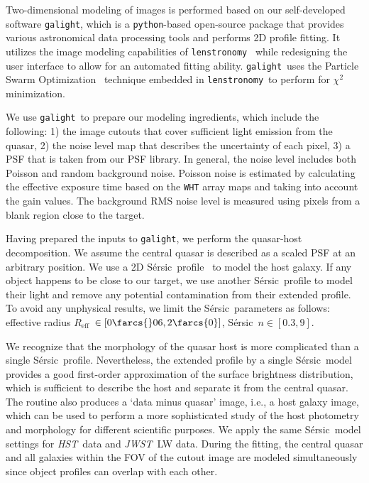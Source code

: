 \documentclass[twocolumn]{aastex631}
\newcommand{\sersic}{S\'ersic}
\newcommand{\lenstronomy}{\texttt{lenstronomy}}
\newcommand{\galight}{\texttt{galight}}
\newcommand{\reff}{{$R_{\mathrm{eff}}$}}
\newcommand{\hst}{{\it HST}}
\newcommand{\jwst}{{\it JWST}}
\begin{document}
Two-dimensional modeling of images is performed based on our self-developed software \galight, which is a \texttt{python}-based open-source package that provides various astronomical data processing tools and performs 2D profile fitting. It utilizes the image modeling capabilities of \lenstronomy~\citep{2018PDU....22..189B, 2021JOSS....6.3283B} while redesigning the user interface to allow for an automated fitting ability. \galight\ uses the Particle Swarm Optimization~\citep{Kennedy1995} technique embedded in \lenstronomy\ to perform for $\chi ^2$ minimization. 

We use \galight\ to prepare our modeling ingredients, which include the following: 1) the image cutouts that cover sufficient light emission from the quasar, 2) the noise level map that describes the uncertainty of each pixel, 3) a PSF that is taken from our PSF library. In general, the noise level includes both Poisson and random background noise. Poisson noise is estimated by calculating the effective exposure time based on the \texttt{WHT} array maps and taking into account the gain values. The background RMS noise level is measured using pixels from a blank region close to the target. 

Having prepared the inputs to \galight, we perform the quasar-host decomposition. We assume the central quasar is described as a scaled PSF at an arbitrary position. We use a 2D \sersic\ profile~\citep{sersic} to model the host galaxy. If any object happens to be close to our target, we use another \sersic\ profile to model their light and remove any potential contamination from their extended profile. To avoid any unphysical results, we limit the \sersic\ parameters as follows: effective radius \reff~$\in[0\farcs{}06,2\farcs{0}]$, \sersic\ $n\in[0.3,9]$.

We recognize that the morphology of the quasar host is more complicated than a single \sersic\ profile. Nevertheless, the extended profile by a single \sersic\ model provides a good first-order approximation of the surface brightness distribution, which is sufficient to describe the host and separate it from the central quasar. The routine also produces a `data minus quasar' image, i.e., a host galaxy image, which can be used to perform a more sophisticated study of the host photometry and morphology for different scientific purposes. We apply the same \sersic\ model settings for \hst\ data and \jwst\ LW data. During the fitting, the central quasar and all galaxies within the FOV of the cutout image are modeled simultaneously since object profiles can overlap with each other.
\end{document}
